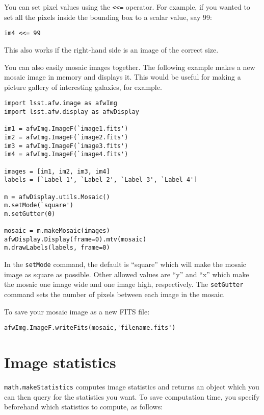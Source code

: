 You can set pixel values using the \texttt{<<=} operator.  For
example, if you wanted to set all the pixels inside the bounding box to a
scalar value, say 99:

\begin{verbatim}
im4 <<= 99
\end{verbatim}

This also works if the right-hand side is an image of the correct size.

You can also easily mosaic images together.  The following example
makes a new mosaic image in memory and displays it.  This would be
useful for making a picture gallery of interesting galaxies, for
example.

\begin{verbatim}
import lsst.afw.image as afwImg
import lsst.afw.display as afwDisplay

im1 = afwImg.ImageF(`image1.fits')
im2 = afwImg.ImageF(`image2.fits')
im3 = afwImg.ImageF(`image3.fits')
im4 = afwImg.ImageF(`image4.fits')

images = [im1, im2, im3, im4]
labels = [`Label 1', `Label 2', `Label 3', `Label 4']

m = afwDisplay.utils.Mosaic()
m.setMode(`square')
m.setGutter(0)

mosaic = m.makeMosaic(images)
afwDisplay.Display(frame=0).mtv(mosaic)
m.drawLabels(labels, frame=0)
\end{verbatim}

In the \texttt{setMode} command, the default is ``square'' which will
make the mosaic image as square as possible.  Other allowed values are
``y'' and ``x'' which make the mosaic one image wide and one image
high, respectively.  The \texttt{setGutter} command sets the number of
pixels between each image in the mosaic.

To save your mosaic image as a new FITS file:

\begin{verbatim}
afwImg.ImageF.writeFits(mosaic,'filename.fits')
\end{verbatim}


\section{Image statistics}

\texttt{math.makeStatistics} computes image statistics and returns an
object which you can then query for the statistics you want.  To save
computation time, you specify beforehand which statistics to compute,
as follows:

